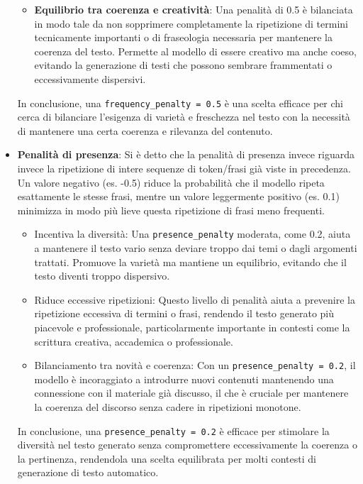\begin{itemize}
\begin{itemize}
                \item \textbf{Equilibrio tra coerenza e creatività}: Una penalità di 0.5 è bilanciata in modo tale da non sopprimere completamente la ripetizione di termini tecnicamente importanti o di fraseologia necessaria per mantenere la coerenza del testo. Permette al modello di essere creativo ma anche coeso, evitando la generazione di testi che possono sembrare frammentati o eccessivamente dispersivi.
            \end{itemize}
        
            In conclusione, una \texttt{frequency\_penalty = 0.5} è una scelta efficace per chi cerca di bilanciare l'esigenza di varietà e freschezza nel testo con la necessità di mantenere una certa coerenza e rilevanza del contenuto.

        \item
            \textbf{Penalità di presenza}: Si è detto che la penalità di presenza invece riguarda invece la ripetizione di intere sequenze di token/frasi già viste in precedenza. Un valore negativo (es. -0.5) riduce la probabilità che il modello ripeta esattamente le stesse frasi, mentre un valore leggermente positivo (es. 0.1) minimizza in modo più lieve questa ripetizione di frasi meno frequenti.
            \begin{itemize}
                \item Incentiva la diversità: Una \texttt{presence\_penalty} moderata, come 0.2, aiuta a mantenere il testo vario senza deviare troppo dai temi o dagli argomenti trattati. Promuove la varietà ma mantiene un equilibrio, evitando che il testo diventi troppo dispersivo.
                    
                \item Riduce eccessive ripetizioni: Questo livello di penalità aiuta a prevenire la ripetizione eccessiva di termini o frasi, rendendo il testo generato più piacevole e professionale, particolarmente importante in contesti come la scrittura creativa, accademica o professionale.
                    
                \item Bilanciamento tra novità e coerenza: Con un \texttt{presence\_penalty = 0.2}, il modello è incoraggiato a introdurre nuovi contenuti mantenendo una connessione con il materiale già discusso, il che è cruciale per mantenere la coerenza del discorso senza cadere in ripetizioni monotone.
            \end{itemize}
        
            In conclusione, una \texttt{presence\_penalty = 0.2} è efficace per stimolare la diversità nel testo generato senza compromettere eccessivamente la coerenza o la pertinenza, rendendola una scelta equilibrata per molti contesti di generazione di testo automatico.
        \end{itemize}
        
